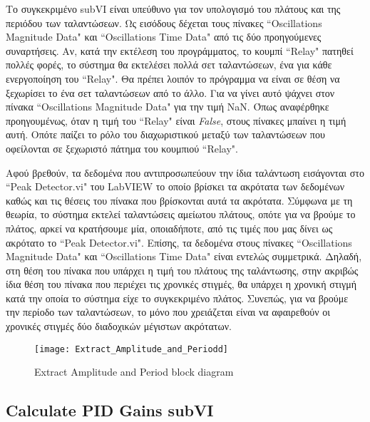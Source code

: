 Το συγκεκριμένο subVI είναι υπεύθυνο για τον υπολογισμό του πλάτους και της περιόδου των ταλαντώσεων. Ως εισόδους δέχεται τους πίνακες ``Oscillations Magnitude Data" και ``Oscillations Time Data" από τις δύο προηγούμενες συναρτήσεις. Αν, κατά την εκτέλεση του προγράμματος, το κουμπί ``Relay" πατηθεί πολλές φορές, το σύστημα θα εκτελέσει πολλά σετ ταλαντώσεων, ένα για κάθε ενεργοποίηση του ``Relay". Θα πρέπει λοιπόν το πρόγραμμα να είναι σε θέση να ξεχωρίσει το ένα σετ ταλαντώσεων από το άλλο. Για να γίνει αυτό ψάχνει στον πίνακα ``Oscillations Magnitude Data" για την τιμή NaN. Όπως αναφέρθηκε προηγουμένως, όταν η τιμή του ``Relay" είναι \textit{False}, στους πίνακες μπαίνει η τιμή αυτή. Οπότε παίζει το ρόλο του διαχωριστικού μεταξύ των ταλαντώσεων που οφείλονται σε ξεχωριστό πάτημα του κουμπιού ``Relay".

Αφού βρεθούν, τα δεδομένα που αντιπροσωπεύουν την ίδια ταλάντωση εισάγονται στο ``Peak Detector.vi" του LabVIEW το οποίο βρίσκει τα ακρότατα των δεδομένων καθώς και τις θέσεις του πίνακα που βρίσκονται αυτά τα ακρότατα. Σύμφωνα με τη θεωρία, το σύστημα εκτελεί ταλαντώσεις αμείωτου πλάτους, οπότε για να βρούμε το πλάτος, αρκεί να κρατήσουμε μία, οποιαδήποτε, από τις τιμές που μας δίνει ως ακρότατο το ``Peak Detector.vi". Επίσης, τα δεδομένα  στους πίνακες ``Oscillations Magnitude Data" και ``Oscillations Time Data" είναι εντελώς συμμετρικά. Δηλαδή, στη θέση του πίνακα που υπάρχει η τιμή του πλάτους της ταλάντωσης, στην ακριβώς ίδια θέση του πίνακα που περιέχει τις χρονικές στιγμές, θα υπάρχει η χρονική στιγμή κατά την οποία το σύστημα είχε το συγκεκριμένο πλάτος. Συνεπώς, για να βρούμε την περίοδο των ταλαντώσεων, το μόνο που χρειάζεται είναι να αφαιρεθούν οι χρονικές στιγμές δύο διαδοχικών μέγιστων ακρότατων.

\begin{figure}[h]
  \centering
  \texttt{[image: Extract\_Amplitude\_and\_Periodd]}
  \caption{Extract Amplitude and Period block diagram}
  \label{fig:Extract_Amplitude_and_Periodd}
\end{figure}

\subsection{Calculate PID Gains subVI}

